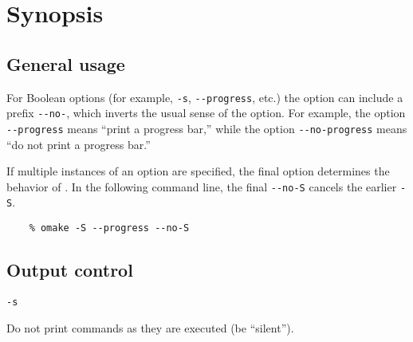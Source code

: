 %
\chapter{Synopsis}
\label{chapter:options}

     

%
\section{General usage}

For Boolean options (for example, \verb+-s+, \verb+--progress+, etc.) the option can include a
prefix \verb+--no-+, which inverts the usual sense of the option.  For example, the option
\verb+--progress+ means ``print a progress bar,''  while the option \verb+--no-progress+ means
``do not print a progress bar.''

If multiple instances of an option are specified, the final option determines the behavior of \OMake{}.
In the following command line, the final \verb+--no-S+ cancels the earlier \verb+-S+.

\begin{verbatim}
    % omake -S --progress --no-S
\end{verbatim}

\section{Output control}

 \verb+-s+

Do not print commands as they are executed (be ``silent'').

